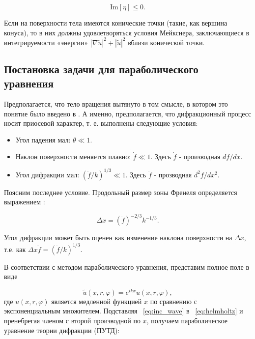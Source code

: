 \begin{equation}
\label{eq:neizl}
\text{Im}\left[\eta\right] \leq 0.
\end{equation}

Если на поверхности тела имеются конические точки (такие, как вершина конуса), то в них должны удовлетворяться условия Мейкснера, заключающиеся в интегрируемости «энергии» $|\nabla \tilde{u}|^2 + |\tilde{u}|^2$ вблизи конической точки.

\subsection{Постановка задачи для параболического уравнения}

Предполагается, что тело вращения вытянуто в том смысле, в котором это понятие было введено в \cite{Shanin2017}. А именно, предполагается, что дифракционный процесс носит приосевой характер, т. е. выполнены следующие условия:

\begin{itemize}
	\item Угол падения мал: $\theta \ll 1$.
	\item Наклон поверхности меняется плавно: $\dot{f} \ll 1$. Здесь $\dot{f}$ - производная $df/dx$.
	\item Угол дифракции мал: $(\ddot{f}/k)^{1/3} \ll 1$. Здесь $\ddot{f}$ - прозводная $d^2 f/ dx^2$.
\end{itemize}

Поясним последнее условие. Продольный размер зоны Френеля определяется выражением \cite{Fok1970}:

\begin{equation}
\label{eq:long_fresnel}
\Delta x = \left(\ddot{f}\right)^{-2/3} k^{-1/3}.
\end{equation}

Угол дифракции может быть оценен как изменение наклона поверхности на $\Delta x$, т.е. как $\Delta x \ddot{f} = \left(\ddot{f}/k\right)^{1/3}$.

В соответствии с методом параболического уравнения, представим полное поле в виде

\begin{equation}
\label{eq:inc_wave}
\tilde{u}(x, r, \varphi) = e^{ikx} u(x, r, \varphi),
\end{equation}
где $u(x,r,\varphi)$  является медленной функцией $x$ по сравнению с экспоненциальным множителем. Подставляя ~\eqref{eq:inc_wave} в ~\eqref{eq:helmholtz} и пренебрегая членом с второй производной по $x$, получаем параболическое уравнение теории дифракции (ПУТД):


